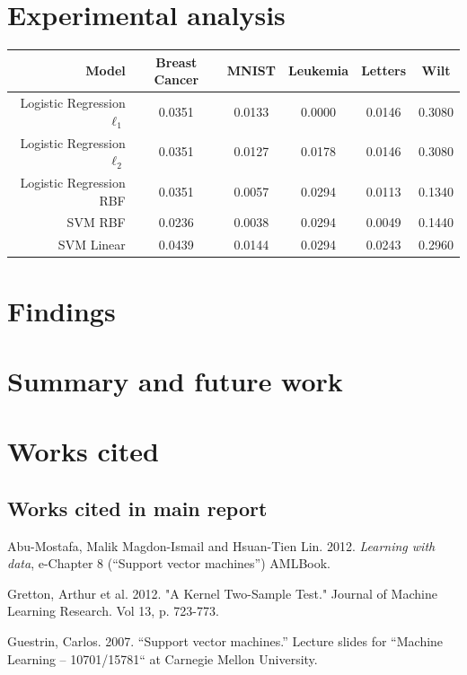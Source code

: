 \documentclass[letterpaper, 11pt]{article}
\begin{document}
\section{Experimental analysis}
\begin{center}
  \begin{tabular}{r|c c c c c}
     Model & Breast Cancer & MNIST & Leukemia & Letters & Wilt \\
     \hline
      Logistic Regression $\ell_1$ & 0.0351 & 0.0133 & 0.0000 & 0.0146 & 0.3080 \\
      Logistic Regression $\ell_2$ & 0.0351 & 0.0127 & 0.0178 & 0.0146 & 0.3080 \\
      Logistic Regression RBF      & 0.0351 & 0.0057 & 0.0294 & 0.0113 & 0.1340 \\
      SVM RBF                      & 0.0236 & 0.0038 & 0.0294 & 0.0049 & 0.1440 \\
      SVM Linear                   & 0.0439 & 0.0144 & 0.0294 & 0.0243 & 0.2960 \\
\end{tabular}
\end{center}

\section{Findings}

\section{Summary and future work}

\section{Works cited}

\subsection{Works cited in main report}

Abu-Mostafa, Malik Magdon-Ismail and Hsuan-Tien Lin. 2012. \emph{Learning with data}, e-Chapter 8 (``Support vector machines'') AMLBook.

Gretton, Arthur et al. 2012. "A Kernel Two-Sample Test." Journal of Machine Learning Research. Vol 13, p. 723-773.

Guestrin, Carlos. 2007. ``Support vector machines.'' Lecture slides for ``Machine Learning – 10701/15781`` at Carnegie Mellon University. 
\end{document}
